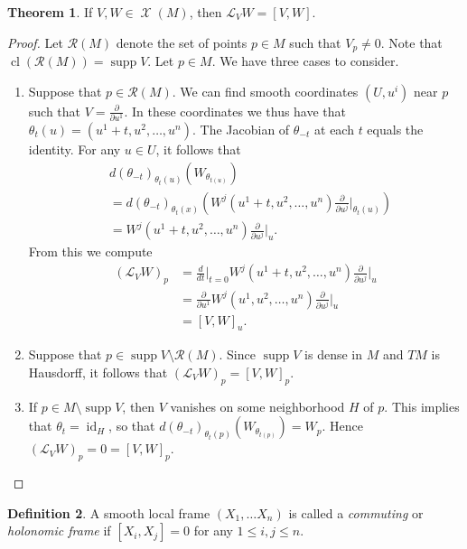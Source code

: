 \documentclass[10pt,letterpaper,cm]{nupset}
\theoremstyle{definition}
\newtheorem{definition}{Definition}[subsection]
\theoremstyle{theorem}
\newtheorem{theorem}[definition]{Theorem}
\theoremstyle{remark}
\newcommand{\1}{\mathbf{1}}
\newcommand{\0}{\vec 0}
\DeclareMathOperator{\id}{id}
\DeclareMathOperator{\supp}{supp}
\DeclareMathOperator{\cl}{cl}
\DeclareMathOperator{\vf}{\mathscr{X}}
\begin{document}
\begin{theorem}
If $V, W\in \vf(M)$, then $\mathcal{L}_VW = [V, W]$.
\end{theorem}
\begin{proof}
Let $\mathcal{R}(M)$ denote the set of points $p\in M$ such that $V_p\ne 0$. Note that $\cl\left(\mathcal{R}(M)\right) = \supp V$. Let $p\in M$. We have three cases to consider.
\begin{enumerate}[label=(\roman*)]
\item Suppose that $p\in \mathcal{R}(M)$. We can find smooth coordinates $\left(U, u^i\right)$ near $p$ such that $V= \frac{\partial}{\partial{u^1}}$. In these coordinates we thus have that $\theta_t(u) = (u^1 +t, u^2, \ldots, u^n)$. The Jacobian of ${\theta_{-t}}$ at each $t$ equals the identity. For any $u\in U$, it follows that
\begin{align*}
& d(\theta_{-t})_{\theta_t(u)}\left(W_{\theta_{t(u)}}\right)
\\ & = d(\theta_{-t})_{\theta_t(x)} \left(W^j(u^1 + t, u^2, \ldots, u^n)\frac{\partial}{\partial{u^j}}\bigr\rvert_{\theta_t(u)}\right)
\\ & = W^j(u^1 + t, u^2, \ldots, u^n)\frac{\partial}{\partial{u^j}}\bigr\rvert_{u}.
\end{align*}
From this we compute
\begin{align*}
 \left(\mathcal{L}_VW\right)_p &= \frac{d}{dt}\bigr\rvert_{t=0} W^j(u^1 + t, u^2, \ldots, u^n)\frac{\partial}{\partial{u^j}}\bigr\rvert_{u}
\\ & = \frac{\partial}{\partial{u^1}}W^j(u^1 , u^2, \ldots, u^n)\frac{\partial}{\partial{u^j}}\bigr\rvert_{u}
\\ & = \left[V, W\right]_u
.\end{align*}
\item Suppose that $p\in \supp V \setminus \mathcal{R}(M)$. Since $\supp V$ is dense in $M$ and $TM$ is Hausdorff, it follows that $\left(\mathcal{L}_VW\right)_p = \left[V, W\right]_p$.
\item If $p\in  M\setminus \supp V$, then $V$ vanishes on some neighborhood $H$ of $p$. This implies that $\theta_t = \id_H$, so that $d(\theta_{-t})_{\theta_t(p)}\left(W_{\theta_{t(p)}}\right) = W_p$. Hence $\left(\mathcal{L}_VW\right)_p =0 = [V, W]_p$.
\end{enumerate}
\end{proof}

\begin{definition}
A smooth local frame $\left(X_1, \ldots X_n\right)$ is called a \textit{commuting} or \textit{holonomic frame} if $\left[X_i, X_j\right]=0$ for any $1\leq i,j\leq n$.
\end{definition}
\end{document}
